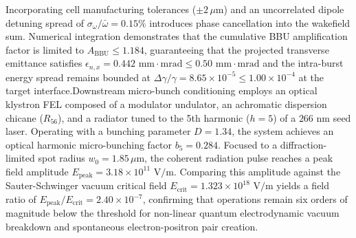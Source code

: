 \begin{sloppypar}
Incorporating cell manufacturing tolerances ($\pm 2\,\mu\text{m}$) and an uncorrelated dipole detuning spread of $\sigma_\omega / \bar{\omega} = 0.15\%$ introduces phase cancellation into the wakefield sum. Numerical integration demonstrates that the cumulative BBU amplification factor is limited to $A_{\text{BBU}} \le 1.184$, guaranteeing that the projected transverse emittance satisfies $\epsilon_{n,x} = 0.442\text{ mm}\cdot\text{mrad} \le 0.50\text{ mm}\cdot\text{mrad}$ and the intra-burst energy spread remains bounded at $\Delta \gamma / \gamma = 8.65 \times 10^{-5} \le 1.00 \times 10^{-4}$ at the target interface.Downstream micro-bunch conditioning employs an optical klystron FEL composed of a modulator undulator, an achromatic dispersion chicane ($R_{56}$), and a radiator tuned to the 5th harmonic ($h = 5$) of a $266\text{ nm}$ seed laser. Operating with a bunching parameter $D = 1.34$, the system achieves an optical harmonic micro-bunching factor $b_5 = 0.284$. Focused to a diffraction-limited spot radius $w_0 = 1.85\,\mu\text{m}$, the coherent radiation pulse reaches a peak field amplitude $E_{\text{peak}} = 3.18 \times 10^{11}\text{ V/m}$. Comparing this amplitude against the Sauter-Schwinger vacuum critical field $E_{\text{crit}} = 1.323 \times 10^{18}\text{ V/m}$ yields a field ratio of $E_{\text{peak}} / E_{\text{crit}} = 2.40 \times 10^{-7}$, confirming that operations remain six orders of magnitude below the threshold for non-linear quantum electrodynamic vacuum breakdown and spontaneous electron-positron pair creation.\end{sloppypar}
